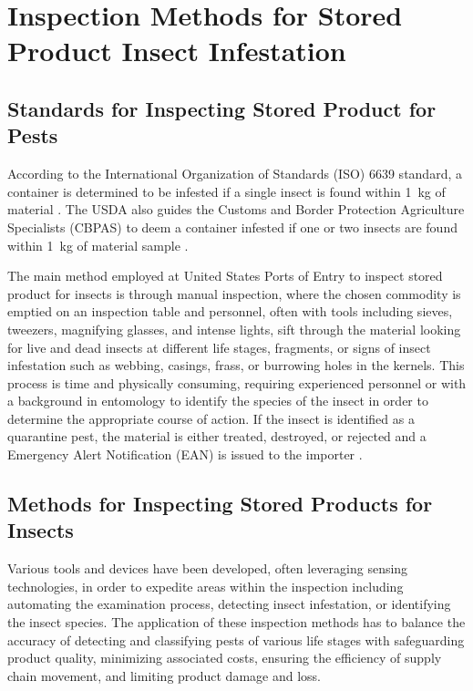 \section{Inspection Methods for Stored Product Insect Infestation}

\subsection{Standards for Inspecting Stored Product for Pests}

According to the International Organization of Standards (ISO) 6639 standard, a container is determined to be infested if a single insect is found within \SI{1}{\kilo\gram} of material \cite{ISO6639Cereals1986}. The USDA also guides the Customs and Border Protection Agriculture Specialists (CBPAS) to deem a container infested if one or two insects are found within \SI{1}{\kilo\gram} of material sample \cite{service2015a}.

The main method employed at United States Ports of Entry to inspect stored product for insects is through manual inspection, where the chosen commodity is emptied on an inspection table and personnel, often with tools including sieves, tweezers, magnifying glasses, and intense lights, sift through the material looking for live and dead insects at different life stages, fragments, or signs of insect infestation such as webbing, casings, frass, or burrowing holes in the kernels. This process is time and physically consuming, requiring experienced personnel or with a background in entomology to identify the species of the insect in order to determine the appropriate course of action. If the insect is identified as a quarantine pest, the material is either treated, destroyed, or rejected and a Emergency Alert Notification (EAN) is issued to the importer \cite{service2015a}.

\subsection{Methods for Inspecting Stored Products for Insects}

Various tools and devices have been developed, often leveraging sensing technologies, in order to expedite areas within the inspection including automating the examination process, detecting insect infestation, or identifying the insect species. The application of these inspection methods has to balance the accuracy of detecting and classifying pests of various life stages with safeguarding product quality, minimizing associated costs, ensuring the efficiency of supply chain movement, and limiting product damage and loss. %

